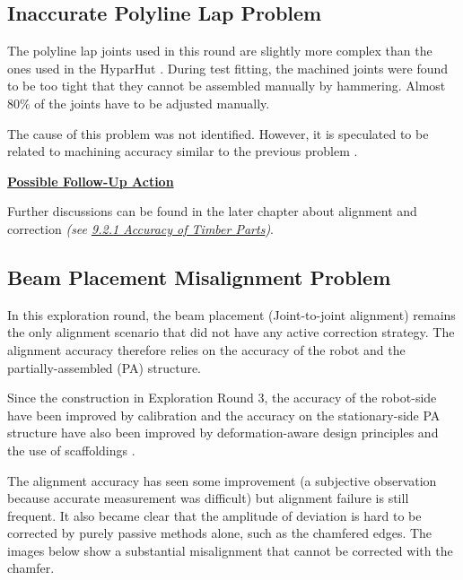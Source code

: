 \subsection{Inaccurate Polyline Lap Problem}
\label{subsection:exploration-5-inaccurate-polyline-lap-problem}

The polyline lap joints used in this round are slightly more complex than the ones used in the HyparHut . During test fitting, the machined joints were found to be too tight that they cannot be assembled manually by hammering. Almost 80$\%$ of the joints have to be adjusted manually. 

The cause of this problem was not identified. However, it is speculated to be related to machining accuracy similar to the previous problem .

\textbf{\ul{Possible Follow-Up Action}}

Further discussions can be found in the later chapter about alignment and correction \textit{(see \ul{9.2.1 Accuracy of Timber Parts})}.

\subsection{Beam Placement Misalignment Problem}
\label{subsection:exploration-5-beam-placement-misalignment-problem}

In this exploration round, the beam placement (Joint-to-joint alignment) remains the only alignment scenario that did not have any active correction strategy. The alignment accuracy therefore relies on the accuracy of the robot and the partially-assembled (PA) structure. 

Since the construction in Exploration Round 3, the accuracy of the robot-side have been improved by calibration  and the accuracy on the stationary-side PA structure have also been improved by deformation-aware design principles  and the use of scaffoldings  .

The alignment accuracy has seen some improvement (a subjective observation because accurate measurement was difficult) but alignment failure is still frequent. It also became clear that the amplitude of deviation is hard to be corrected by purely passive methods alone, such as the chamfered edges. The images below show a substantial misalignment that cannot be corrected with the chamfer. 

